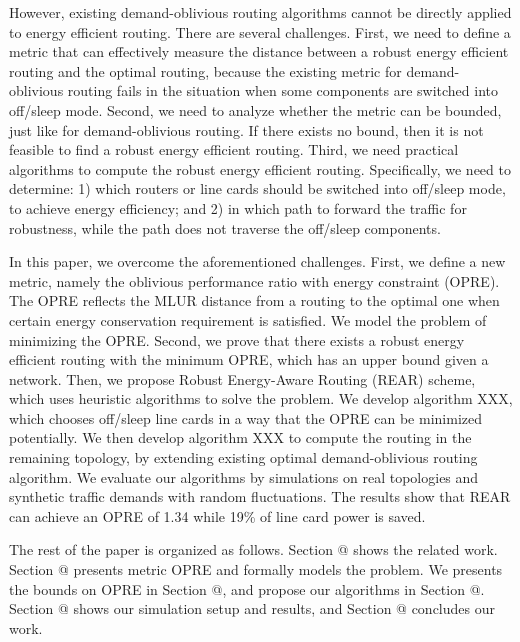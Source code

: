 \documentclass[conference]{IEEEtran}
\makeatletter
\newcommand{\Rmnum}[1]{\expandafter\@slowromancap\romannumeral #1@}
\makeatother
\begin{document}
However, existing demand-oblivious routing algorithms cannot be directly applied to energy efficient routing. There are several challenges. First, we need to define a metric that can effectively measure the distance between a robust energy efficient routing and the optimal routing, because the existing metric for demand-oblivious routing fails in the situation when some components are switched into off/sleep mode. Second, we need to analyze whether the metric can be bounded, just like for demand-oblivious routing. If there exists no bound, then it is not feasible to find a robust energy efficient routing. Third, we need practical algorithms to compute the robust energy efficient routing. Specifically, we need to determine: 1) which routers or line cards should be switched into off/sleep mode, to achieve energy efficiency; and 2) in which path to forward the traffic for robustness, while the path does not traverse the off/sleep components.

In this paper, we overcome the aforementioned challenges. First, we define a new metric, namely the oblivious performance ratio with energy constraint (OPRE). The OPRE reflects the MLUR distance from a routing to the optimal one when certain energy conservation requirement is satisfied. We model the problem of minimizing the OPRE. Second, we prove that there exists a robust energy efficient routing with the minimum OPRE, which has an upper bound given a network. Then, we propose Robust Energy-Aware Routing (REAR) scheme, which uses heuristic algorithms to solve the problem. We develop algorithm XXX, which chooses off/sleep line cards in a way that the OPRE can be minimized potentially. We then develop algorithm XXX to compute the routing in the remaining topology, by extending existing optimal demand-oblivious routing algorithm. We evaluate our algorithms by simulations on real topologies and synthetic traffic demands with random fluctuations. The results show that REAR can achieve an OPRE of 1.34 while 19\% of line card power is saved.

The rest of the paper is organized as follows. Section \Rmnum{2} shows the related work. Section \Rmnum{3} presents metric OPRE and formally models the problem. We presents the bounds on OPRE in Section \Rmnum{4}, and propose our algorithms in Section \Rmnum{5}. Section \Rmnum{6} shows our simulation setup and results, and Section \Rmnum{7} concludes our work.
\end{document}
